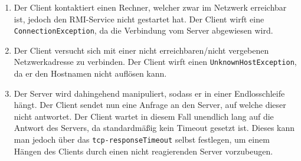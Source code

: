 \documentclass[german,12pt,a4paper]{article}
\begin{document}
\begin{enumerate}

	\item Der Client kontaktiert einen Rechner, welcher zwar im Netzwerk erreichbar ist, jedoch den RMI-Service nicht gestartet hat.
	Der Client wirft eine \texttt{ConnectionException}, da die Verbindung vom Server abgewiesen wird.
	 
	\item Der Client versucht sich mit einer nicht erreichbaren/nicht vergebenen Netzwerkadresse zu verbinden. 
	Der Client wirft einen \texttt{UnknownHostException}, da er den Hostnamen nicht auflösen kann.

	\item Der Server wird dahingehend manipuliert, sodass er in einer Endlosschleife hängt. Der Client sendet nun eine Anfrage an 
	den Server, auf welche dieser nicht antwortet. Der Client wartet in diesem Fall unendlich lang auf die Antwort des Servers, da standardmäßig 
	kein Timeout gesetzt ist. Dieses kann man jedoch über das \texttt{tcp-responseTimeout} selbst festlegen, um einem Hängen des Clients durch einen 
	nicht reagierenden Server vorzubeugen.
	
\end{enumerate}
\end{document}

